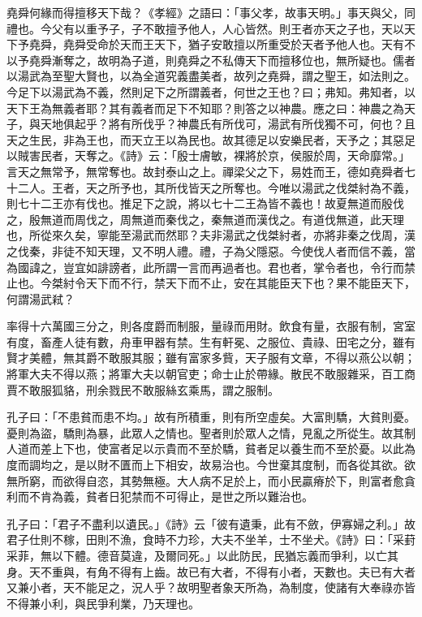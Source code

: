 
堯舜何緣而得擅移天下哉？《孝經》之語曰：「事父孝，故事天明。」事天與父，同禮也。今父有以重予子，子不敢擅予他人，人心皆然。則王者亦天之子也，天以天下予堯舜，堯舜受命於天而王天下，猶子安敢擅以所重受於天者予他人也。天有不以予堯舜漸奪之，故明為子道，則堯舜之不私傳天下而擅移位也，無所疑也。儒者以湯武為至聖大賢也，以為全道究義盡美者，故列之堯舜，謂之聖王，如法則之。今足下以湯武為不義，然則足下之所謂義者，何世之王也？曰；弗知。弗知者，以天下王為無義者耶？其有義者而足下不知耶？則答之以神農。應之曰：神農之為天子，與天地俱起乎？將有所伐乎？神農氏有所伐可，湯武有所伐獨不可，何也？且天之生民，非為王也，而天立王以為民也。故其德足以安樂民者，天予之；其惡足以賊害民者，天奪之。《詩》云：「殷士膚敏，裸將於京，侯服於周，天命靡常。」言天之無常予，無常奪也。故封泰山之上。禪梁父之下，易姓而王，德如堯舜者七十二人。王者，天之所予也，其所伐皆天之所奪也。今唯以湯武之伐桀紂為不義，則七十二王亦有伐也。推足下之說，將以七十二王為皆不義也！故夏無道而殷伐之，殷無道而周伐之，周無道而秦伐之，秦無道而漢伐之。有道伐無道，此天理也，所從來久矣，寧能至湯武而然耶？夫非湯武之伐桀紂者，亦將非秦之伐周，漢之伐秦，非徒不知天理，又不明人禮。禮，子為父隱惡。今使伐人者而信不義，當為國諱之，豈宜如誹謗者，此所謂一言而再過者也。君也者，掌令者也，令行而禁止也。今桀紂令天下而不行，禁天下而不止，安在其能臣天下也？果不能臣天下，何謂湯武弒？


率得十六萬國三分之，則各度爵而制服，量祿而用財。飲食有量，衣服有制，宮室有度，畜產人徒有數，舟車甲器有禁。生有軒冕、之服位、貴祿、田宅之分，雖有賢才美體，無其爵不敢服其服；雖有富家多貲，天子服有文章，不得以燕公以朝；將軍大夫不得以燕；將軍大夫以朝官吏；命士止於帶緣。散民不敢服雜采，百工商賈不敢服狐貉，刑余戮民不敢服絲玄乘馬，謂之服制。


孔子曰：「不患貧而患不均。」故有所積重，則有所空虛矣。大富則驕，大貧則憂。憂則為盜，驕則為暴，此眾人之情也。聖者則於眾人之情，見亂之所從生。故其制人道而差上下也，使富者足以示貴而不至於驕，貧者足以養生而不至於憂。以此為度而調均之，是以財不匱而上下相安，故易治也。今世棄其度制，而各從其欲。欲無所窮，而欲得自恣，其勢無極。大人病不足於上，而小民贏瘠於下，則富者愈貪利而不肯為義，貧者日犯禁而不可得止，是世之所以難治也。


孔子曰：「君子不盡利以遺民。」《詩》云「彼有遺秉，此有不斂，伊寡婦之利。」故君子仕則不稼，田則不漁，食時不力珍，大夫不坐羊，士不坐犬。《詩》曰：「采葑采菲，無以下體。德音莫違，及爾同死。」以此防民，民猶忘義而爭利，以亡其身。天不重與，有角不得有上齒。故已有大者，不得有小者，天數也。夫已有大者又兼小者，天不能足之，況人乎？故明聖者象天所為，為制度，使諸有大奉祿亦皆不得兼小利，與民爭利業，乃天理也。


